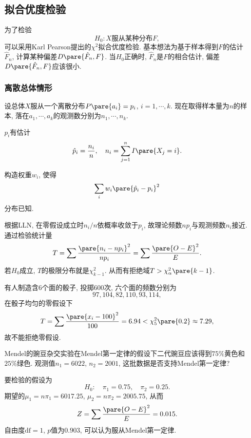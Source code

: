 \documentclass[../Statistics.tex]{subfiles}
\begin{document}



\subsection{拟合优度检验} %
\label{sub:拟合优度检验}

为了检验
\[ H_0: \text{$X$服从某种分布$F$}, \]
可以采用Karl Pearson提出的$\chi^2$拟合优度检验. 基本想法为基于样本得到$F$的估计$\hat F_n$, 计算某种偏差$D\pare{\hat F_n, F}$. 当$H_0$正确时, $\hat F_n$是$F$的相合估计, 偏差$D\pare{\hat F_n,F}$应该很小.

\subsubsection{离散总体情形} %
\label{ssub:离散总体情形}

设总体$X$服从一个离散分布$P\pare{a_i} = p_i$, $i = 1,\cdots,k$. 现在取得样本量为$n$的样本, 落在$a_1,\cdots,a_k$的观测数分别为$n_1,\cdots,n_k$.
\begin{cenum}
    \item $p_i$有估计
    \[ \hat p_i = \frac{n_i}{n},\quad n_i = \sum_{j=1}^n I\pare{X_j = i}. \]
    \item 构造权重$w_i$, 使得
    \[ \sum_{i} w_i\pare{\hat p_i - p_i}^2 \]
    分布已知.
\end{cenum}
根据LLN, 在零假设成立时$n_i/n$依概率收敛于$p_i$, 故理论频数$np_i$与观测频数$n_i$接近. 通过检验统计量
\[ T = \sum \frac{\pare{n_i - np_i}^2}{np_i} = \sum \frac{\pare{O-E}^2}{E}. \]
若$H_0$成立, $T$的极限分布就是$\chi^2_{k-1}$. 从而有拒绝域$T>\chi_\alpha^2\pare{k-1}$.
\begin{sample}
    \begin{ex}
        有人制造含$6$个面的骰子, 投掷$600$次, 六个面的频数分别为
        \[ 97, 104, 82, 110, 93, 114, \]
        在骰子均匀的零假设下
        \[ T = \sum \frac{\pare{x_i - 100}^2}{100} = 6.94 < \chi_5^2\pare{0.2}\approx 7.29, \]
        故不能拒绝零假设.
    \end{ex}
\end{sample}
\begin{sample}
    \begin{ex}
        Mendel的豌豆杂交实验在Mendel第一定律的假设下二代豌豆应该得到$75\%$黄色和$25\%$绿色. 观测值$n_1 = 6022$, $n_2 = 2001$, 这批数据是否支持Mendel第一定律?
    \end{ex}
    \begin{solution}
        要检验的假设为
        \[ H_0:\quad \pi_1 = 0.75,\quad \pi_2 = 0.25. \]
        期望的$\mu_1 = n\pi_1 = 6017.25$, $\mu_2 = n\pi_2 = 2005.75$, 从而
        \[ Z = \sum \frac{\pare{O-E}^2}{E} = 0.015. \]
        自由度$\mathrm{df} = 1$, $p$值为$0.903$, 可以认为服从Mendel第一定律.
    \end{solution}
\end{sample}
\end{document}
